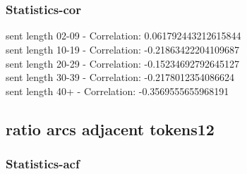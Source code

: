 \documentclass{article}%
\begin{document}
\begin{figure}[ht]%
\centering%
\setlength{\abovecaptionskip}{-35pt}%
%
%
\\%
%
%
\\%
%
\end{figure}

%
\newpage%
\subsubsection{Statistics{-}cor}%
\label{ssubsec:Statistics{-}cor}%
\noindent%
sent length 02-09 - Correlation: 0.061792443212615844\\%
sent length 10-19 - Correlation: -0.21863422204109687\\%
sent length 20-29 - Correlation: -0.15234692792645127\\%
sent length 30-39 - Correlation: -0.2178012354086624\\%
sent length 40+ - Correlation: -0.3569555655968191\\

%
\newpage

%
\subsection{ratio arcs adjacent tokens12}%
\label{subsec:ratioarcsadjacenttokens12}%
\subsubsection{Statistics{-}acf}%
\label{ssubsec:Statistics{-}acf}%
\end{document}
